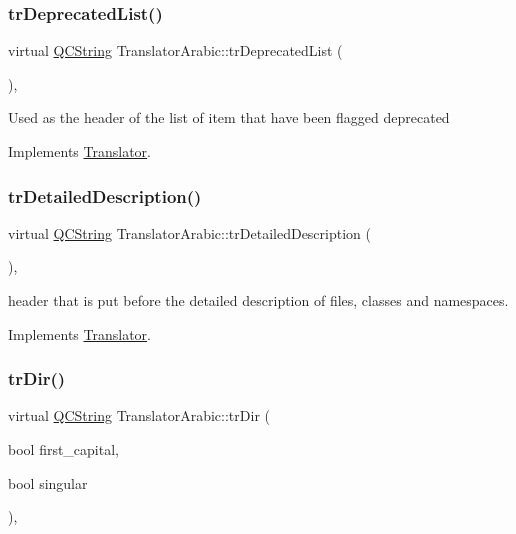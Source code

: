 \subsubsection{\texorpdfstring{trDeprecatedList()}{trDeprecatedList()}}
{\footnotesize\ttfamily virtual \mbox{\hyperlink{class_q_c_string}{Q\+C\+String}} Translator\+Arabic\+::tr\+Deprecated\+List (\begin{DoxyParamCaption}{ }\end{DoxyParamCaption})\hspace{0.3cm}{\ttfamily [inline]}, {\ttfamily [virtual]}}

Used as the header of the list of item that have been flagged deprecated 

Implements \mbox{\hyperlink{class_translator}{Translator}}.

\mbox{\label{class_translator_arabic_a7d59b4e35fc8f4cdd25705a1a58f0b69}} 
\subsubsection{\texorpdfstring{trDetailedDescription()}{trDetailedDescription()}}
{\footnotesize\ttfamily virtual \mbox{\hyperlink{class_q_c_string}{Q\+C\+String}} Translator\+Arabic\+::tr\+Detailed\+Description (\begin{DoxyParamCaption}{ }\end{DoxyParamCaption})\hspace{0.3cm}{\ttfamily [inline]}, {\ttfamily [virtual]}}

header that is put before the detailed description of files, classes and namespaces. 

Implements \mbox{\hyperlink{class_translator}{Translator}}.

\mbox{\label{class_translator_arabic_acfbf7905304c071ff1c4c233d27c6021}} 
\subsubsection{\texorpdfstring{trDir()}{trDir()}}
{\footnotesize\ttfamily virtual \mbox{\hyperlink{class_q_c_string}{Q\+C\+String}} Translator\+Arabic\+::tr\+Dir (\begin{DoxyParamCaption}\item[{bool}]{first\+\_\+capital,  }\item[{bool}]{singular }\end{DoxyParamCaption})\hspace{0.3cm}{\ttfamily [inline]}, {\ttfamily [virtual]}}

